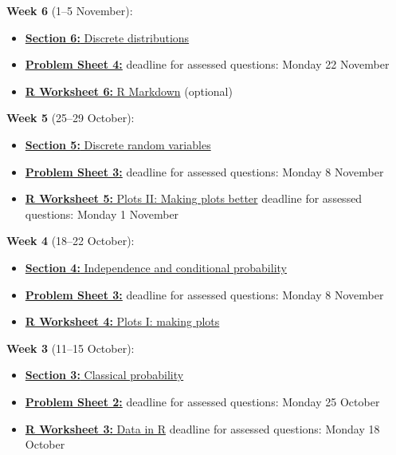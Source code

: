 \documentclass[
  a4paper,
]{book}
\providecommand{\tightlist}{%
  \setlength{\itemsep}{0pt}\setlength{\parskip}{0pt}}
\theoremstyle{definition}
\theoremstyle{definition}
\theoremstyle{definition}
\theoremstyle{definition}
\theoremstyle{remark}
\begin{document}
\textbf{Week 6} (1--5 November):

\begin{itemize}
\tightlist
\item
  \protect\hyperlink{S06-discrete-dist}{\textbf{Section 6:} Discrete distributions}
\item
  \protect\hyperlink{P4}{\textbf{Problem Sheet 4:}} deadline for assessed questions: Monday 22 November
\item
  \protect\hyperlink{r-work}{\textbf{R Worksheet 6:} R Markdown} (optional)
\end{itemize}

\textbf{Week 5} (25--29 October):

\begin{itemize}
\tightlist
\item
  \protect\hyperlink{S05-discrete-rv}{\textbf{Section 5:} Discrete random variables}
\item
  \protect\hyperlink{P3}{\textbf{Problem Sheet 3:}} deadline for assessed questions: Monday 8 November
\item
  \protect\hyperlink{r-work}{\textbf{R Worksheet 5:} Plots II: Making plots better} deadline for assessed questions: Monday 1 November
\end{itemize}

\textbf{Week 4} (18--22 October):

\begin{itemize}
\tightlist
\item
  \protect\hyperlink{S04-conditional}{\textbf{Section 4:} Independence and conditional probability}
\item
  \protect\hyperlink{P3}{\textbf{Problem Sheet 3:}} deadline for assessed questions: Monday 8 November
\item
  \protect\hyperlink{r-work}{\textbf{R Worksheet 4:} Plots I: making plots}
\end{itemize}

\textbf{Week 3} (11--15 October):

\begin{itemize}
\tightlist
\item
  \protect\hyperlink{S03-classical}{\textbf{Section 3:} Classical probability}
\item
  \protect\hyperlink{P2}{\textbf{Problem Sheet 2:}} deadline for assessed questions: Monday 25 October
\item
  \protect\hyperlink{r-work}{\textbf{R Worksheet 3:} Data in R} deadline for assessed questions: Monday 18 October
\end{itemize}
\end{document}
